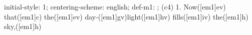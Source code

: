 initial-style: 1;
centering-scheme: english;
def-m1: \grealign;
(c4) 1. Now([em1]ev) that([em1]c) the([em1]ev) day-([em1]gv)light([em1]hv) fills([em1]iv) the([em1]h) sky,([em1]h)